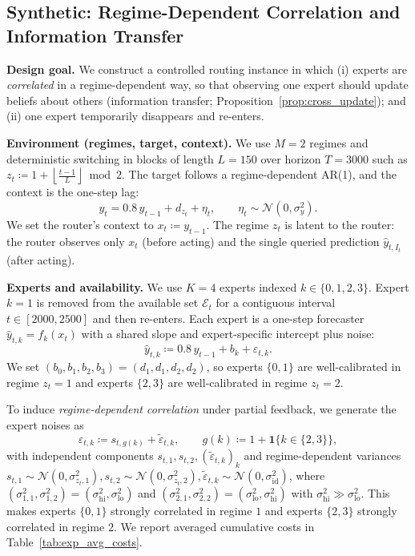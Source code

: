 \subsection{Synthetic: Regime-Dependent Correlation and Information Transfer}
\label{sec:exp_synthetic_transfer}

\textbf{Design goal.}
We construct a controlled routing instance in which (i) experts are \emph{correlated} in a
regime-dependent way, so that observing one expert should update beliefs about others (information
transfer; Proposition~\ref{prop:cross_update}); and (ii) one expert temporarily disappears and
re-enters.

\textbf{Environment (regimes, target, context).}
We use \(M=2\) regimes and deterministic switching in blocks of length \(L=150\) over horizon
\(T=3000\) such as $z_t \coloneqq 1 + \left\lfloor \frac{t-1}{L}\right\rfloor \bmod 2$.
The target follows a regime-dependent AR(1), and the context is the one-step lag:
\begin{equation*}
y_t = 0.8\,y_{t-1} + d_{z_t} + \eta_t,\qquad \eta_t\sim\mathcal{N}(0,\sigma_y^2).
\end{equation*}
We set the router's context to \(x_t\coloneqq y_{t-1}\).
The regime \(z_t\) is latent to the router: the router observes only \(x_t\) (before acting) and the
single queried prediction \(\hat y_{t,I_t}\) (after acting).

\textbf{Experts and availability.}
We use \(K=4\) experts indexed \(k\in\{0,1,2,3\}\). Expert \(k=1\) is removed from the available set \(\mathcal{E}_t\)
for a contiguous interval \(t\in[2000,2500]\) and then re-enters. Each expert is a one-step forecaster
\(\hat y_{t,k}=f_k(x_t)\) with a shared slope and expert-specific intercept plus noise:
\begin{equation*}
\label{eq:exp_synth_expert_rule}
\hat y_{t,k} \coloneqq 0.8\,y_{t-1} + b_k + \varepsilon_{t,k}.
\end{equation*}
We set \((b_0,b_1,b_2,b_3)=(d_1,d_1,d_2,d_2)\), so experts \(\{0,1\}\) are well-calibrated in regime
\(z_t=1\) and experts \(\{2,3\}\) are well-calibrated in regime \(z_t=2\).

To induce \emph{regime-dependent correlation} under partial feedback, we generate the expert noises as
\[
\varepsilon_{t,k} \coloneqq s_{t,g(k)} + \tilde\varepsilon_{t,k},
\qquad
g(k)\coloneqq 1+\mathbf{1}\{k\in\{2,3\}\},
\]
with independent components \(s_{t,1},s_{t,2},(\tilde\varepsilon_{t,k})_{k}\) and regime-dependent
variances $s_{t,1}\sim\mathcal{N}(0,\sigma_{z_t,1}^2), s_{t,2}\sim\mathcal{N}(0,\sigma_{z_t,2}^2),
\tilde\varepsilon_{t,k}\sim\mathcal{N}(0,\sigma_{\mathrm{id}}^2)$, where \((\sigma_{1,1}^2,\sigma_{1,2}^2)=(\sigma_{\mathrm{hi}}^2,\sigma_{\mathrm{lo}}^2)\) and
\((\sigma_{2,1}^2,\sigma_{2,2}^2)=(\sigma_{\mathrm{lo}}^2,\sigma_{\mathrm{hi}}^2)\) with
\(\sigma_{\mathrm{hi}}^2\gg\sigma_{\mathrm{lo}}^2\). This makes experts \(\{0,1\}\) strongly
correlated in regime \(1\) and experts \(\{2,3\}\) strongly correlated in regime \(2\). We report
averaged cumulative costs in Table~\ref{tab:exp_avg_costs}.


